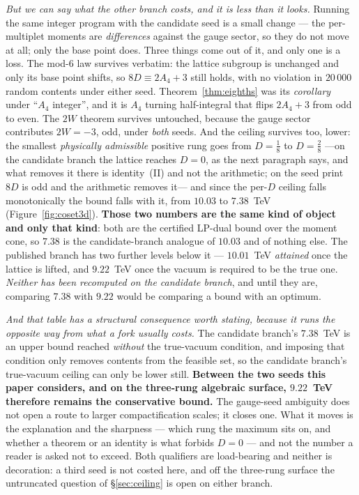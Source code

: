 \documentclass[11pt,a4paper]{article}
\begin{document}
\begin{itemize}
\emph{But we can say what the other branch costs, and it is less than it looks.} Running the same
integer program with the candidate seed is a small change --- the per-multiplet moments are
\emph{differences} against the gauge sector, so they do not move at all; only the base point does.
Three things come out of it, and only one is a loss. The mod-$6$ law survives verbatim: the lattice
subgroup is unchanged and only its base point shifts, so $8D\equiv 2A_4+3$ still holds, with no
violation in $20\,000$ random contents under either seed. Theorem~\ref{thm:eighths} was its
\emph{corollary} under ``$A_4$ integer'', and it is $A_4$ turning half-integral that flips
$2A_4+3$ from odd to even. The $2W$ theorem survives untouched, because the gauge sector
contributes $2W=-3$, odd, under \emph{both} seeds. And the ceiling survives too, lower: the
smallest \emph{physically admissible} positive rung goes from $D=\tfrac18$ to $D=\tfrac28$
---on the candidate branch the lattice reaches $D=0$, as the next paragraph says, and what removes
it there is identity~(II) and not the arithmetic; on the seed \cite{KM25} print $8D$ is odd and the
arithmetic removes it--- and since the
per-$D$ ceiling falls monotonically the bound falls with it, from $10.03$ to $7.38$~TeV
(Figure~\ref{fig:coset3d}). \textbf{Those two numbers are the same kind of object and only that
kind}: both are the certified LP-dual bound over the moment cone, so $7.38$ is the candidate-branch
analogue of $10.03$ and of nothing else. The published branch has two further levels below it ---
$10.01$~TeV \emph{attained} once the lattice is lifted, and $9.22$~TeV once the vacuum is required
to be the true one. \emph{Neither has been recomputed on the candidate branch}, and until they are,
comparing $7.38$ with $9.22$ would be comparing a bound with an optimum.

\emph{And that table has a structural consequence worth stating, because it runs the opposite way
from what a fork usually costs.} The candidate branch's $7.38$~TeV is an upper bound reached
\emph{without} the true-vacuum condition, and imposing that condition only removes contents from
the feasible set, so the candidate branch's true-vacuum ceiling can only be lower still.
\textbf{Between the two seeds this paper considers, and on the three-rung algebraic surface,
$9.22$~TeV therefore remains the conservative bound.} The gauge-seed ambiguity does not open a
route to larger compactification scales; it closes one. What it moves is the explanation and the
sharpness --- which rung the maximum sits on, and whether a theorem or an identity is what forbids
$D=0$ --- and not the number a reader is asked not to exceed. Both qualifiers are load-bearing and
neither is decoration: a third seed is not costed here, and off the three-rung surface the
untruncated question of \S\ref{sec:ceiling} is open on either branch.


\end{itemize}
\end{document}
